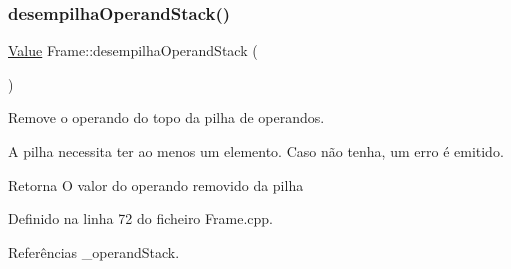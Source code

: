 \subsubsection{\texorpdfstring{desempilha\+Operand\+Stack()}{desempilhaOperandStack()}}
{\footnotesize\ttfamily \hyperlink{structValue}{Value} Frame\+::desempilha\+Operand\+Stack (\begin{DoxyParamCaption}{ }\end{DoxyParamCaption})}



Remove o operando do topo da pilha de operandos. 

A pilha necessita ter ao menos um elemento. Caso não tenha, um erro é emitido. \begin{DoxyReturn}{Retorna}
O valor do operando removido da pilha 
\end{DoxyReturn}


Definido na linha 72 do ficheiro Frame.\+cpp.



Referências \+\_\+operand\+Stack.



